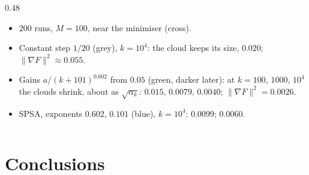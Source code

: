 \documentclass[handoutsbeamer.tex]{subfiles}
\begin{document}
\begin{frame}
{\begin{columns}[c]
\begin{column}{0.48\textwidth}\footnotesize\begin{itemize}\setlength\itemsep{0.3em}
    \item $200$ runs, $M = 100$, near the minimiser (cross).
    \item Constant step $1/20$ (grey), $k = 10^4$: the cloud keeps its size, $0.020$; $\|\nabla F\|^2\approx0.055$.
    \item Gains $a/(k+101)^{0.602}$ from $0.05$ (green, darker later): at $k = 100$, $1000$, $10^4$ the clouds shrink, about as $\sqrt{\alpha_k}$: $0.015$, $0.0079$, $0.0040$; $\|\nabla F\|^2 = 0.0026$.
    \item SPSA, exponents $0.602$, $0.101$ (blue), $k = 10^4$: $0.0099$; $0.0060$.
\end{itemize}\end{column}\end{columns}}
\end{frame}

\begin{frame}
\end{frame}

\section{Conclusions}
\end{document}

